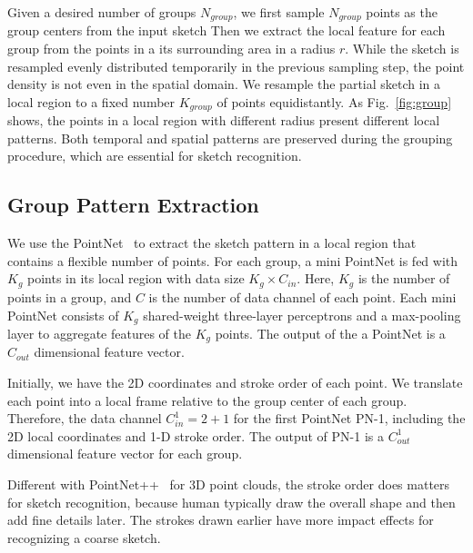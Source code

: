 %
Given a desired number of groups $N_{group}$, we first sample $N_{group}$ points as the group centers from the input sketch  
%
Then we extract the local feature for each group from the points in a its surrounding area in a radius $r$. 
%
While the sketch is resampled evenly distributed temporarily in the previous sampling step, the point density is not even in the spatial 
domain. 
%
We resample the partial sketch in a local region to a fixed number $K_{group}$ of points equidistantly.
%
As Fig.~\ref{fig:group} shows, the points in a local region 
with different radius present different local patterns.
Both temporal and spatial patterns are preserved during the grouping procedure, which are essential for sketch recognition. 




\subsection{Group Pattern Extraction}

We use the PointNet~\cite{qi2017pointnet} to extract the sketch pattern in a local region that contains a flexible number of points. 
%
%
For each group, a mini PointNet is fed with $K_g$ points in its local region with data size $K_g \times C_{in}$. 
Here, $K_g$ is the number of points in a group, and $C$ is the number of data channel of each point.
Each mini PointNet consists of $K_g$ shared-weight three-layer perceptrons and a max-pooling layer to aggregate features of the $K_g$ points.
%
The output of the a PointNet is a $C_{out}$ dimensional feature vector. 

Initially, we have the 2{D} coordinates and stroke order of each point. 
We translate each point into a local frame relative to the group center of each group.
Therefore, the data channel $C^1_{in}=2+1$ for the first PointNet PN-1, including the 2D local coordinates and 1-D stroke order.
The output of PN-1 is a $C^1_{out}$ dimensional feature vector for each group.

%
%
Different with PointNet++~\cite{qi2017pointnetplusplus} for 3D point clouds, the stroke order does matters for sketch recognition, because human typically draw the overall shape and then add fine details later.
%
The strokes drawn earlier have more impact effects for recognizing a coarse sketch.
%

